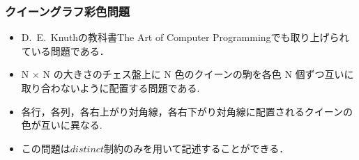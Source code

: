 \documentclass [dvipdfmx,11pt]{beamer}
\newcommand{\distinct}{$distinct$}
\begin{document}
\begin{frame}
    \frametitle{クイーングラフ彩色問題}
    
    \begin{itemize}
        \item D.~E.~Knuthの教科書The Art of Computer Programmingでも取り上げられている問題である．
        \item N × N の大きさのチェス盤上に N 色のクイーンの駒を各色 N 個ずつ互いに取り合わないように配置する問題である.
        \item \alert{各行}，\alert{各列}，\alert{各右上がり対角線}，\alert{各右下がり対角線}に配置されるクイーンの色が互いに異なる.
        \item この問題は\distinct 制約のみを用いて記述することができる．
    \end{itemize}
\end{frame}
\end{document}
